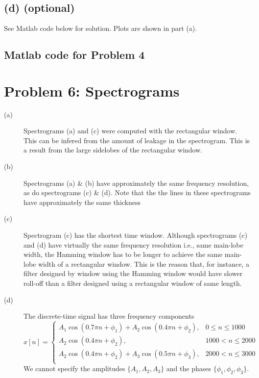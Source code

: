 \documentclass{article}
\begin{document}
\subsection{(d) (optional)}

See Matlab code below for solution. Plots are shown in part (a).

\subsection{Matlab code for Problem 4}



\section{Problem 6: Spectrograms}
\begin{description}
	\item[(a)] Spectrograms (a) and (c) were computed with the rectangular window. This can be infered from the amount of leakage in the spectrogram. This is a result from the large sidelobes of the rectangular window.
	\item[(b)] Spectrograms (a) \& (b) have approximately the same frequency resolution, as do spectrograms (c) \& (d). Note that the the lines in these spectrograms have approximately the same thickness
	\item[(c)] Spectrogram (c) has the shortest time window. Although spectrograms (c) and (d) have virtually the same frequency resolution i.e., same main-lobe width, the Hamming window has to be longer to achieve the same main-lobe width of a rectangular window. This is the reason that, for instance, a filter designed by window using the Hamming window would have slower roll-off than a filter designed using a rectangular window of same length.
	\item[(d)] 
	The discrete-time signal has three frequency components
	\begin{equation}
		x[n] = \begin{cases}
		A_1\cos(0.7\pi n + \phi_1) + A_2\cos(0.4\pi n + \phi_2), & 0 \leq n \leq 1000 \\
		A_2\cos(0.4\pi n + \phi_2), & 1000 < n \leq 2000 \\
		A_2\cos(0.4\pi n + \phi_2) + A_3\cos(0.5\pi n + \phi_3), & 2000 < n \leq 3000 \\
		\end{cases}
	\end{equation}
	We cannot specify the amplitudes $\{A_1, A_2, A_3\}$ and the phases $\{\phi_1, \phi_2, \phi_3\}$.
	

\end{description}
\end{document}

